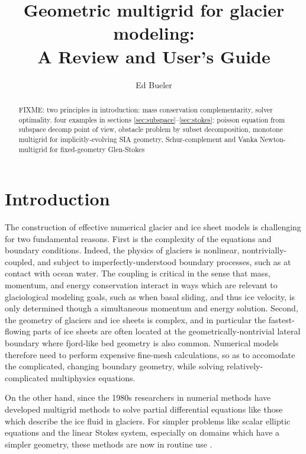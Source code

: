 \documentclass[letterpaper,final,12pt,reqno]{amsart}
\numberwithin{equation}{section}
\numberwithin{figure}{section}
\numberwithin{table}{section}
\begin{document}
\title[Geometric multigrid for glacier modeling]{Geometric multigrid for glacier modeling: \\ A Review and User's Guide}

\author{Ed Bueler}

\begin{abstract} FIXME: two principles in introduction: mass conservation complementarity, solver optimality.  four examples in sections \ref{sec:subspace}--\ref{sec:stokes}: poisson equation from subspace decomp point of view, obstacle problem by subset decomposition, monotone multigrid for implicitly-evolving SIA geometry, Schur-complement and Vanka Newton-multigrid for fixed-geometry Glen-Stokes
\end{abstract}

\maketitle

\tableofcontents

\thispagestyle{empty}
\bigskip

\section{Introduction} \label{sec:intro}

The construction of effective numerical glacier and ice sheet models is challenging for two fundamental reasons.  First is the complexity of the equations and boundary conditions.  Indeed, the physics of glaciers is nonlinear, nontrivially-coupled, and subject to imperfectly-understood boundary processes, such as at contact with ocean water.  The coupling is critical in the sense that mass, momentum, and energy conservation interact in ways which are relevant to glaciological modeling goals, such as when basal sliding, and thus ice velocity, is only determined though a simultaneous momentum and energy solution.  Second, the geometry of glaciers and ice sheets is complex, and in particular the fastest-flowing parts of ice sheets are often located at the geometrically-nontrivial lateral boundary where fjord-like bed geometry is also common.  Numerical models therefore need to perform expensive fine-mesh calculations, so as to accomodate the complicated, changing boundary geometry, while solving relatively-complicated multiphysics equations.

On the other hand, since the 1980s researchers in numerial methods have developed multigrid methods to solve partial differential equations like those which describe the ice fluid in glaciers.   For simpler problems like scalar elliptic equations and the linear Stokes system, especially on domains which have a simpler geometry, these methods are now in routine use \cite{Briggsetal2000,Bueler2021,Trottenbergetal2001}.
\end{document}
